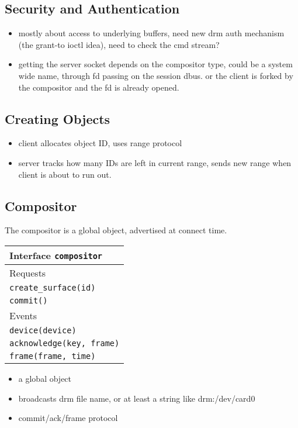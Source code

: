 \documentclass{article}
\begin{document}
\subsection{Security and Authentication}

\begin{itemize}
\item mostly about access to underlying buffers, need new drm auth
  mechanism (the grant-to ioctl idea), need to check the cmd stream?

\item getting the server socket depends on the compositor type, could
  be a system wide name, through fd passing on the session dbus. or
  the client is forked by the compositor and the fd is already opened.
\end{itemize}

\subsection{Creating Objects}

\begin{itemize}
\item client allocates object ID, uses range protocol
\item server tracks how many IDs are left in current range, sends new
  range when client is about to run out.
\end{itemize}

\subsection{Compositor}

The compositor is a global object, advertised at connect time.

\begin{tabular}{l}
  \hline 
  Interface \texttt{compositor} \\ \hline 
  Requests \\ \hline 
  \texttt{create\_surface(id)} \\
  \texttt{commit()} \\ \hline
  Events \\ \hline
  \texttt{device(device)} \\
  \texttt{acknowledge(key, frame)} \\
  \texttt{frame(frame, time)} \\ \hline
\end{tabular}


\begin{itemize}
\item a global object
\item broadcasts drm file name, or at least a string like drm:/dev/card0
\item commit/ack/frame protocol
\end{itemize}
\end{document}
